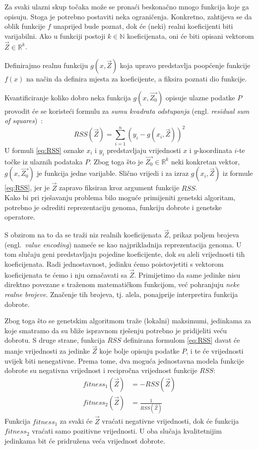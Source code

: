 \documentclass[times, utf8, seminar, numeric]{fer}
\begin{document}
Za svaki ulazni skup točaka može se pronaći beskonačno mnogo funkcija koje ga opisuju.
Stoga je potrebno postaviti neka ograničenja.
Konkretno, zahtijeva se da oblik funkcije $f$ unaprijed bude poznat, dok će (neki) realni koeficijenti biti varijabilni.
Ako u funkciji postoji $k \in \mathbb{N}$ koeficijenata, oni će biti opisani vektorom $\vec{Z} \in \mathbb{R}^k$.

Definirajmo realnu funkciju $g(x, \vec{Z})$ koja upravo predstavlja poopćenje funkcije $f(x)$ na način da definira mjesta za koeficijente, a fiksira poznati dio funkcije.

Kvantificiranje koliko dobro neka funkcija $g(x,\vec{Z_0})$ opisuje ulazne podatke $P$ provodit će se koristeći formulu za \textit{sumu kvadrata odstupanja} (engl. \textit{residual sum of squares})~\cite{WikiResidualSum}:
\begin{equation}
RSS(\vec{Z}) = \sum_{i=1}^{n}\left(y_i - g(x_i, \vec{Z})\right)^2\label{eq:RSS}
\end{equation}
U formuli \eqref{eq:RSS} oznake $x_i$ i $y_i$ predstavljaju vrijednosti $x$ i $y$-koordinata $i$-te točke iz ulaznih podataka $P$.
Zbog toga što je $\vec{Z_0} \in \mathbb{R}^k$ neki konkretan vektor, $g(x,\vec{Z_0})$ je funkcija jedne varijable.
Slično vrijedi i za izraz $g(x_i, \vec{Z})$ iz formule \eqref{eq:RSS}, jer je $\vec{Z}$ zapravo fiksiran kroz argument funkcije $RSS$.\\

Kako bi pri rješavanju problema bilo moguće primijeniti genetski algoritam, potrebno je odrediti reprezentaciju genoma, funkciju dobrote i genetske operatore.

S obzirom na to da se traži niz realnih koeficijenata $\vec{Z}$, prikaz poljem brojeva (engl.~\textit{value encoding}) nameće se kao najprikladnija reprezentacija genoma.
U tom slučaju geni predstavljaju pojedine koeficijente, dok su aleli vrijednosti tih koeficijenata.
Radi jednostavnost, jedinku ćemo poistovjetiti s vektorom koeficijenata te ćemo i nju označavati sa $\vec{Z}$.
Primijetimo da same jedinke nisu direktno povezane s traženom matematičkom funkcijom, već pohranjuju \textit{neke realne brojeve}.
Značenje tih brojeva, tj. alela, ponajprije interpretira funkcija dobrote.

Zbog toga što se genetskim algoritmom traže (lokalni) maksimumi, jedinkama za koje smatramo da su bliže ispravnom rješenju potrebno je pridijeliti veću dobrotu.
S druge strane, funkcija $RSS$ definirana formulom \eqref{eq:RSS} davat će manje vrijednosti za jedinke $\vec{Z}$ koje bolje opisuju podatke $P$, i te će vrijednosti uvijek biti nenegativne.
Prema tome, dva moguća jednostavna modela funkcije dobrote su negativna vrijednost i recipročna vrijednost funkcije $RSS$:
\begin{align}
fitness_1(\vec{Z}) &= -RSS(\vec{Z}) \label{eq:fitnessNeg}\\
fitness_2(\vec{Z}) &= \frac{1}{RSS(\vec{Z})} \label{eq:fitnessInv}
\end{align}
Funkcija $fitness_1$ za svaki će $\vec{Z}$ vraćati negativne vrijednosti, dok će funkcija $fitness_2$ vraćati samo pozitivne vrijednosti.
U oba slučaja kvalitetnijim jedinkama bit će pridružena veća vrijednost dobrote.
\end{document}
